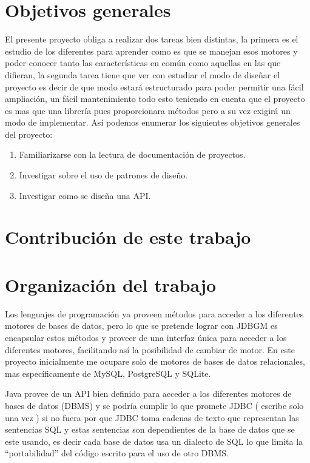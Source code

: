 \section{Objetivos generales}
El presente proyecto obliga a realizar dos tareas bien distintas, la primera es el estudio de los diferentes \dd para aprender como es que se manejan esos motores y poder conocer tanto las características en común como aquellas en las que difieran, la segunda tarea tiene que ver con estudiar el modo de diseñar el proyecto es decir de que modo estará estructurado \jj para poder permitir una fácil ampliación, un fácil mantenimiento todo esto teniendo en cuenta que el proyecto es mas que una librería pues proporcionara métodos pero a su vez exigirá un modo de implementar. Así podemos enumerar los siguientes objetivos generales del proyecto:
\begin{enumerate}
\item Familiarizarse con la lectura de documentación de proyectos.
\item Investigar sobre el uso de patrones de diseño.
\item Investigar como se diseña una API.
\end{enumerate}

\section{Contribución de este trabajo}
\section{Organización del trabajo}


Los lenguajes de programación ya proveen métodos para acceder a los diferentes
motores de bases de datos, pero lo que se pretende lograr con JDBGM es encapsular estos
métodos y proveer de una interfaz única para acceder a los diferentes motores, facilitando
así la posibilidad de cambiar de motor. En este proyecto inicialmente me ocupare solo de
motores de bases de datos relacionales, mas específicamente de MySQL, PostgreSQL y
SQLite.


Java provee de un API bien definido para acceder a los diferentes motores de
bases de datos (DBMS) y se podría cumplir lo que promete JDBC ( escribe solo una
vez ) si no fuera por que JDBC toma cadenas de texto que representan las sentencias
SQL y estas sentencias son dependientes de la base de datos que se este usando, es
decir cada base de datos usa un dialecto de SQL lo que limita la “portabilidad” del
código escrito para el uso de otro DBMS.


